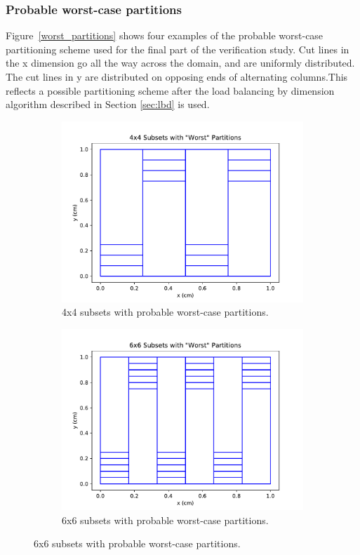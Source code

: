 \documentclass[times,final]{elsarticle}
\begin{document}
\subsubsection{Probable worst-case partitions}
Figure~\ref{worst_partitions} shows four examples of the probable worst-case partitioning scheme used for the final part of the verification study. Cut lines in the x dimension go all the way across the domain, and are uniformly distributed. The cut lines in y are distributed on opposing ends of alternating columns.This reflects a possible partitioning scheme after the load balancing by dimension algorithm described in Section \ref{sec:lbd} is used.
\begin{figure}[H]
\centering
\begin{subfigure}[b]{0.45\textwidth}
  \includegraphics[width=\textwidth]{../Dissertation/cut_line_files/4_worst.pdf}
  \caption{4x4 subsets with probable worst-case partitions.}
  \label{4worst}
\end{subfigure}
\begin{subfigure}[b]{0.45\textwidth}
  \includegraphics[width=\textwidth]{../Dissertation/cut_line_files/6_worst.pdf}
  \caption{6x6 subsets with probable worst-case partitions.}
  \label{6worst}
\end{subfigure}


\end{figure}
\end{document}
